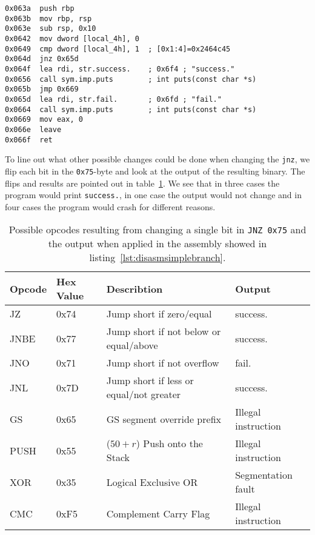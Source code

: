 \begin{minipage}{\linewidth}
\begin{lstlisting}[style=nasm,
                   caption={Disassemby of the main function created by the
code in listing~\ref{lst:csimbranch}. Shows machine code at given address
inside the ELF file, starting at \texttt{0x063a}.},
                   label={lst:disasmsimplebranch}]
0x063a  push rbp
0x063b  mov rbp, rsp
0x063e  sub rsp, 0x10
0x0642  mov dword [local_4h], 0
0x0649  cmp dword [local_4h], 1  ; [0x1:4]=0x2464c45
0x064d  jnz 0x65d
0x064f  lea rdi, str.success.    ; 0x6f4 ; "success."
0x0656  call sym.imp.puts        ; int puts(const char *s)
0x065b  jmp 0x669
0x065d  lea rdi, str.fail.       ; 0x6fd ; "fail."
0x0664  call sym.imp.puts        ; int puts(const char *s)
0x0669  mov eax, 0
0x066e  leave
0x066f  ret
\end{lstlisting}
\end{minipage}

To line out what other possible changes could be done when changing the
\texttt{jnz}, we flip each bit in the \texttt{0x75}-byte and look at the output
of the resulting binary. The flips and results are pointed out in
table~\ref{tab:jnzflips}. We see that in three cases the program would print
\texttt{success.}, in one case the output would not change and in four cases the
program would crash for different reasons.

\begin{table}[]
\begin{tabular}{|l|l|l|l|}
\hline
Opcode & Hex Value & Describtion                                           &
Output              \\ \hline
JZ     & 0x74      & Jump short if zero/equal                              &
success.            \\ \hline
JNBE   & 0x77      & Jump short if not below or equal/above                &
success.            \\ \hline
JNO    & 0x71      & Jump short if not overflow                            &
fail.               \\ \hline
JNL    & 0x7D      & Jump short if less or equal/not greater               &
success.            \\ \hline
GS     & 0x65      & GS segment override prefix                            &
Illegal instruction \\ \hline
PUSH   & 0x55      & ($50+r$) Push onto the Stack &
Illegal instruction \\ \hline
XOR    & 0x35      & Logical Exclusive OR                                  &
Segmentation fault  \\ \hline
CMC    & 0xF5      & Complement Carry Flag                                 &
Illegal instruction \\ \hline
\end{tabular}
\caption{Possible opcodes resulting from changing a single bit in
\texttt{JNZ}~\texttt{0x75} and the output when applied in the assembly showed in
listing~\ref{lst:disasmsimplebranch}.}
\label{tab:jnzflips}
\end{table}

